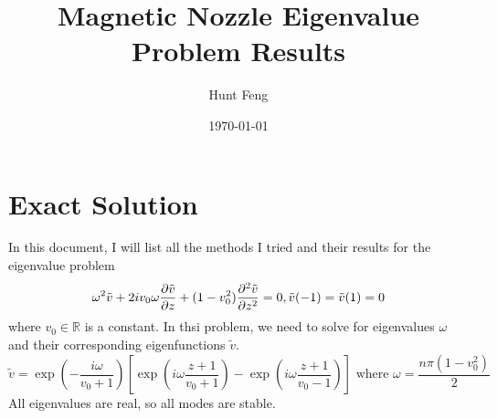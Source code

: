 \documentclass{article}
\title{Magnetic Nozzle Eigenvalue Problem Results}
\author{Hunt Feng}
\date{\today}
\begin{document}
\maketitle

\section{Exact Solution}
In this document, I will list all the methods I tried and their results for the eigenvalue problem
\begin{equation}
    \omega^2\tilde{v} + 2iv_0\omega\pdv{\tilde{v}}{z} + (1-v_0^2)\pdv[2]{\tilde{v}}{z} = 0, \tilde{v}(-1)=\tilde{v}(1) = 0
    \label{eq:original-problem}
\end{equation}
where $v_0\in\mathbb{R}$ is a constant. In thsi problem, we need to solve for eigenvalues $\omega$ and their corresponding eigenfunctions $\tilde{v}$.
\begin{equation}
    \tilde{v} = \exp(-\frac{i\omega}{v_0+1})\left[ \exp(i\omega\frac{z+1}{v_0+1}) - \exp(i\omega\frac{z+1}{v_0-1}) \right] \text{ where } \omega=\frac{n\pi(1-v_0^2)}{2}
\end{equation}
All eigenvalues are real, so all modes are stable.
\end{document}
